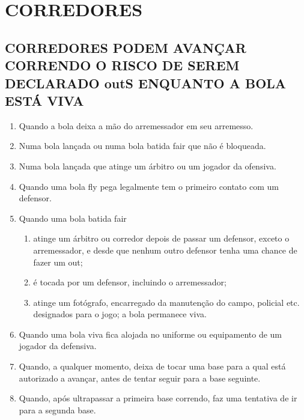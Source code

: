 \section{CORREDORES}
\begin{multicols}{2}	
	
	\subsection{CORREDORES PODEM AVAN\c{C}AR CORRENDO O RISCO DE SEREM DECLARADO \gls{out}S ENQUANTO A BOLA EST\'A VIVA} 
	
	\begin{enumerate}[label=\alph*)]
		\item Quando a bola deixa a m\~ao do arremessador em seu arremesso. 
		\item Numa bola lan\c{c}ada ou numa bola batida \gls{fair} que n\~ao \'e bloqueada. 
		
		\item Numa bola lan\c{c}ada que atinge um \'arbitro ou um jogador da ofensiva. 
		
		\item Quando uma bola \gls{fly} pega legalmente tem o primeiro contato com um defensor. 
		
		\item Quando uma bola batida \gls{fair} 
		
		\begin{enumerate}[label=\roman*.]
			\item  atinge um \'arbitro ou corredor depois de passar um defensor, exceto o arremessador, e desde que nenhum outro defensor tenha uma chance de fazer 
			um \gls{out}; 
			
			\item  \'e tocada por um defensor, incluindo o arremessador; 
			
			\item  atinge um fot\'ografo, encarregado da manuten\c{c}\~ao do campo, policial etc. designados para o jogo; a bola permanece viva. 
		\end{enumerate}	
		\item  Quando uma bola viva fica alojada no uniforme ou equipamento de um jogador da defensiva. 
		
		\item  Quando, a qualquer momento, deixa de tocar uma base para a qual est\'a autorizado a avan\c{c}ar, antes de tentar seguir para a base seguinte. 
		
		\item  Quando, ap\'os ultrapassar a primeira base correndo, faz uma tentativa de ir para a segunda base. 
		

\end{enumerate}
\end{multicols}

